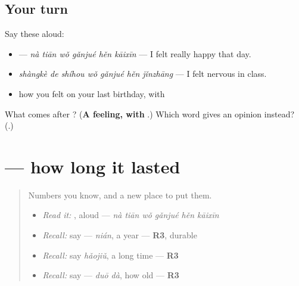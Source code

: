 \subsection*{Your turn}
Say these aloud:

\begin{itemize}
\raggedright
  \item {} — \emph{nà tiān wǒ gǎnjué hěn kāixīn} — I felt really happy that day.
  \item \emph{shàngkè de shíhou wǒ gǎnjué hěn jǐnzhāng} — I felt nervous in class.
  \item how you felt on your last birthday, with 
\end{itemize}

\begin{tcolorbox}[breakable,colback=teal!4,colframe=teal!35!black,title={Before you move on}]
What comes after ? (\textbf{A feeling, with }.) Which word gives an opinion instead? (\textbf{}.)
\end{tcolorbox}
\section[\texorpdfstring{\zh{学了两年} (xué le liǎng nián)}{学了两年 (xué le liǎng nián)}]{ — how long it lasted}

\label{lesson:ZH-C286-duration}



\begin{quote}
Numbers you know, and a new place to put them.

\begin{itemize}
\raggedright
  \item \emph{Read it:} , aloud — \emph{nà tiān wǒ gǎnjué hěn kāixīn}
  \item \emph{Recall:} say  — \emph{nián}, a year — \textbf{R3}, durable
  \item \emph{Recall:} say \emph{hǎojiǔ}, a long time — \textbf{R3}
  \item \emph{Recall:} say  — \emph{duō dà}, how old — \textbf{R3}
\end{itemize}
\end{quote}

